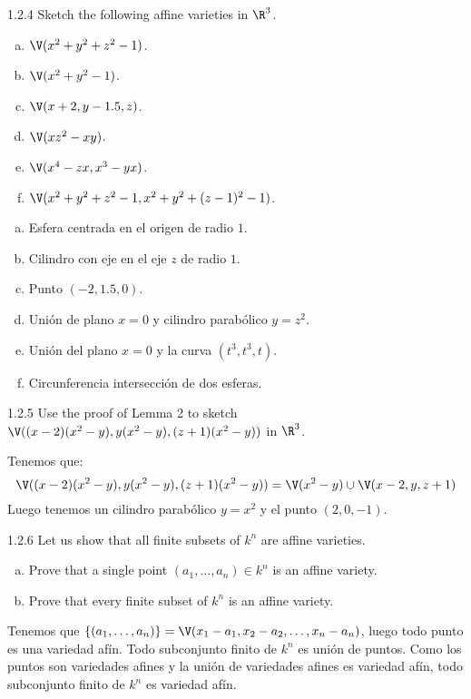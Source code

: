 \documentclass[twoside]{article}
\begin{document}
\begin{ejercicio}{1.2.4}
Sketch the following affine varieties in $\R^3$.
\begin{enumerate}[a.]
\item $\V(x^2+y^2+z^2-1)$.
\item $\V(x^2+y^2-1)$.
\item $\V(x+2,y-1.5,z)$.
\item $\V(xz^2-xy)$.
\item $\V(x^4-zx,x^3-yx)$.
\item $\V(x^2+y^2+z^2-1, x^2+y^2+(z-1)^2-1)$.
\end{enumerate}
\end{ejercicio}
\begin{solucion}
\begin{enumerate}[a.]
\item Esfera centrada en el origen de radio $1$.
\item Cilindro con eje en el eje $z$ de radio $1$.
\item Punto $(-2,1.5,0)$.
\item Unión de plano $x=0$ y cilindro parabólico $y=z^2$.
\item Unión del plano $x=0$ y la curva $(t^3,t^3,t)$.
\item Circunferencia intersección de dos esferas.
\end{enumerate}
\end{solucion}

\begin{ejercicio}{1.2.5}
Use the proof of Lemma 2 to sketch $\V((x-2)(x^2-y),y(x^2-y),(z+1)(x^2-y))$ in $\R^3$.
\end{ejercicio}
\begin{solucion}
Tenemos que:
\[ \V((x-2)(x^2-y),y(x^2-y),(z+1)(x^2-y)) = \V(x^2-y) \cup \V(x-2,y,z+1) \]
Luego tenemos un cilindro parabólico $y=x^2$ y el punto $(2,0,-1)$.
\end{solucion}

\begin{ejercicio}{1.2.6}
Let us show that all finite subsets of $k^n$ are affine varieties.
\begin{enumerate}[a.]
\item Prove that a single point $(a_1,\dots,a_n) \in k^n$ is an affine variety.
\item Prove that every finite subset of $k^n$ is an affine variety.
\end{enumerate}
\end{ejercicio}
\begin{solucion}
Tenemos que $\{(a_1,\dots,a_n)\} = \V(x_1-a_1,x_2-a_2,\dots,x_n-a_n)$, luego todo punto es una variedad afín.
Todo subconjunto finito de $k^n$ es unión de puntos.
Como los puntos son variedades afines y la unión de variedades afines es variedad afín, todo subconjunto finito de $k^n$ es variedad afín.
\end{solucion}
\end{document}

